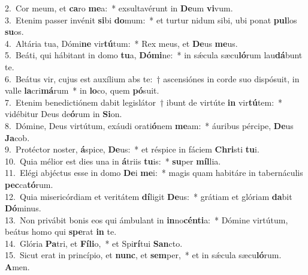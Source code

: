 {2.~}Cor meum, et \textbf{ca}ro \textbf{me}a:~* exsultavérunt in \textbf{De}um \textbf{vi}vum.\\
{3.~}Etenim passer invénit \textbf{si}bi \textbf{do}mum:~* et turtur nidum sibi, ubi ponat \textbf{pul}los \textbf{su}os.\\
{4.~}Altária tua, Dómi\textbf{ne} vir\textbf{tú}tum:~* Rex meus, et \textbf{De}us \textbf{me}us.\\
{5.~}Beáti, qui hábitant in domo \textbf{tu}a, \textbf{Dó}\textbf{mi}ne:~* in sǽcula sæcu\textbf{ló}rum lau\textbf{dá}bunt te.\\
{6.~}Beátus vir, cujus est auxílium abs te:~† ascensiónes in corde suo dispósuit, in valle \textbf{la}cri\textbf{má}rum~* in \textbf{lo}co, quem \textbf{pó}suit.\\
{7.~}Etenim benedictiónem dabit legislátor~† ibunt de virtúte \textbf{in} vir\textbf{tú}tem:~* vidébitur Deus de\textbf{ó}rum in \textbf{Si}on.\\
{8.~}Dómine, Deus virtútum, exáudi orati\textbf{ó}nem \textbf{me}am:~* áuribus pércipe, \textbf{De}us \textbf{Ja}cob.\\
{9.~}Protéctor noster, \textbf{á}spice, \textbf{De}us:~* et réspice in fáciem \textbf{Chri}sti \textbf{tu}i.\\
{10.~}Quia mélior est dies una in \textbf{á}triis \textbf{tu}is:~* \textbf{su}per \textbf{míl}lia.\\
{11.~}Elégi abjéctus esse in domo \textbf{De}i \textbf{me}i:~* magis quam habitáre in tabernáculis \textbf{pec}ca\textbf{tó}rum.\\
{12.~}Quia misericórdiam et veritátem \textbf{dí}ligit \textbf{De}us:~* grátiam et glóriam \textbf{da}bit \textbf{Dó}minus.\\
{13.~}Non privábit bonis eos qui ámbulant in \textbf{in}no\textbf{cén}\textbf{ti}a:~* Dómine virtútum, beátus homo qui \textbf{spe}rat \textbf{in} te.\\
{14.~}Glória \textbf{Pa}tri, et \textbf{Fí}\textbf{li}o,~* et Spi\textbf{rí}tui \textbf{San}cto.\\
{15.~}Sicut erat in princípio, et \textbf{nunc}, et \textbf{sem}per,~* et in sǽcula sæcu\textbf{ló}rum. \textbf{A}men.\\
